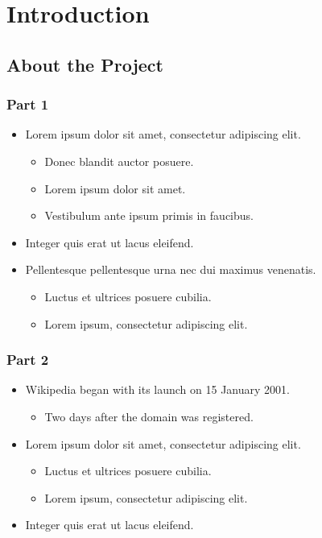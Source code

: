 \section{Introduction}


\subsection{About the Project}


\begin{frame}
	\frametitle{Part 1}
	\begin{itemize}
		\item Lorem ipsum dolor sit amet, consectetur adipiscing elit.
		\begin{itemize}
			\item Donec blandit auctor posuere.
			\item Lorem ipsum dolor sit amet.
			\item Vestibulum ante ipsum primis in faucibus.
		\end{itemize}
		\item Integer quis erat ut lacus eleifend.
		\item Pellentesque pellentesque urna nec dui maximus venenatis.
		\begin{itemize}
			\item Luctus et ultrices posuere cubilia.
			\item Lorem ipsum, consectetur adipiscing elit.
		\end{itemize}
	\end{itemize}
\end{frame}


\begin{frame}
	\frametitle{Part 2}
	\begin{itemize}
		\item Wikipedia began with its launch on 15 January 2001.
		\begin{itemize}
			\item Two days after the domain was registered.
		\end{itemize}
		\item Lorem ipsum dolor sit amet, consectetur adipiscing elit.
		\begin{itemize}
			\item Luctus et ultrices posuere cubilia.
			\item Lorem ipsum, consectetur adipiscing elit.
		\end{itemize}
		\item Integer quis erat ut lacus eleifend.
	\end{itemize}
\end{frame}


